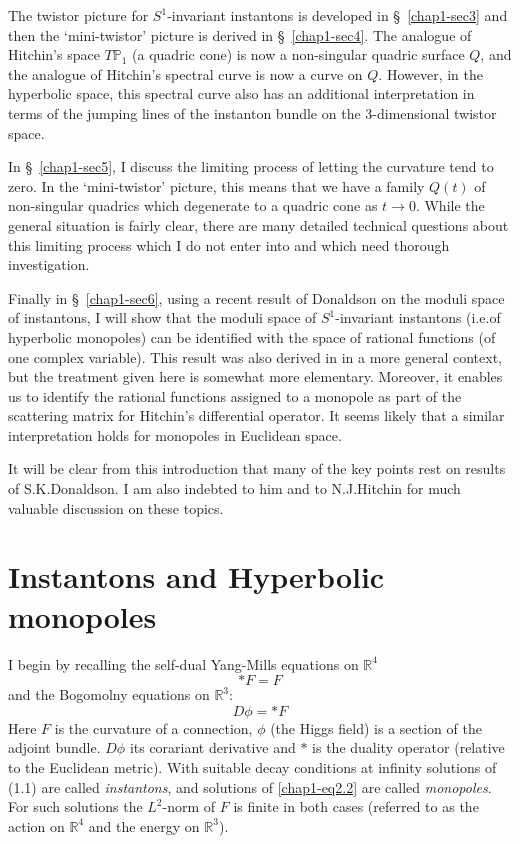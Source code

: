 The twistor picture for $S^{1}$-invariant instantons is developed in
\S\ \ref{chap1-sec3} and then the `mini-twistor' picture is derived in
\S\ \ref{chap1-sec4}. The analogue of Hitchin's space
$T\mathbb{P}_{1}$ (a quadric cone) is now a non-singular quadric
surface $Q$, and the analogue of Hitchin's spectral curve is now a
curve on $Q$. However, in the hyperbolic space, this spectral curve
also has an additional interpretation in terms of the jumping lines of
the instanton bundle on the 3-dimensional twistor space.

In \S\ \ref{chap1-sec5}, I discuss the limiting process of letting the
curvature tend to zero. In the `mini-twistor' picture, this means that
we have a family $Q(t)$ of non-singular quadrics which degenerate to a
quadric cone as $t\to 0$. While the general situation is fairly clear,
there are many detailed technical questions about this limiting
process which I do not enter into and which need thorough
investigation.

Finally in \S\ \ref{chap1-sec6}, using a recent result of Donaldson
\cite{chap1-key4} on the moduli space of instantons, I will show that
the moduli space of $S^{1}$-invariant instantons (i.e.\@ of hyperbolic
monopoles) can be identified with the space of rational functions (of
one complex variable). This result was also derived in
\cite{chap1-key2} in a more general context, but the treatment given
here is somewhat more elementary. Moreover, it enables us to identify
the rational functions assigned to a monopole as part of the
scattering matrix for Hitchin's differential operator. It seems likely
that a similar interpretation holds for monopoles in Euclidean space.

It will be clear from this introduction that many of the key
points\pageoriginale 
rest on results of S.K.\@ Donaldson. I am also indebted to him and to
N.J.\@ Hitchin for much valuable discussion on these topics.

\section{Instantons and Hyperbolic monopoles}\label{chap1-sec2}

I begin by recalling the self-dual Yang-Mills equations on
$\mathbb{R}^{4}$
\begin{equation}
\ast F=F\label{chap1-eq2.1}
\end{equation}
and the Bogomolny equations on $\mathbb{R}^{3}$:
\begin{equation}
D\phi=\ast F\label{chap1-eq2.2}
\end{equation}
Here $F$ is the curvature of a connection, $\phi$ (the Higgs field) is
a section of the adjoint bundle. $D\phi$ its corariant derivative and
$\ast$ is the duality operator (relative to the Euclidean
metric). With suitable decay conditions at infinity solutions of
(1.1) are called {\em instantons}, and solutions of
\eqref{chap1-eq2.2} are called {\em monopoles}. For such solutions the
$L^{2}$-norm of $F$ is finite in both cases (referred to as the action
on $\mathbb{R}^{4}$ and the energy on $\mathbb{R}^{3}$).

